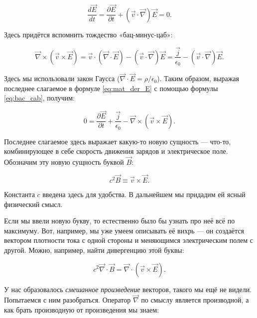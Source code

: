 \documentclass[a4paper,12pt]{article}
\newcommand{\pt}{\partial}
\newcommand{\eps}{\epsilon}
\newcommand{\vn}{\vec{\nabla}}
\begin{document}
\begin{equation}
  \label{eq:mat_der_E}
  \frac{d\vec{E}}{dt} = \frac{\pt \vec{E}}{\pt t} + (\vec{v}\cdot \vn)
  \vec{E} = 0.
\end{equation}

Здесь придётся вспомнить тождество «бац-минус-цаб»: 

\begin{equation}
  \label{eq:bac_cab}
  \vn \times \left( \vec{v} \times \vec{E} \right) = \vec{v} \cdot (\vn
  \cdot \vec{E}) - (\vec{v}\cdot \vn) \vec{E} = \frac{\vec{j}}{\eps_0}  -
  (\vec{v}\cdot \vn) \vec{E}.
\end{equation}

Здесь мы использовали закон Гаусса ($\vn \cdot \vec{E} = \rho/\eps_0$). Таким образом, выражая последнее слагаемое в формуле
\eqref{eq:mat_der_E} с помощью формулы \eqref{eq:bac_cab}, получим: 

\begin{equation}
  \label{eq:maxwell_eq_4_1}
  0 = \frac{\pt \vec{E}}{\pt t} + \frac{\vec{j}}{\eps_0} - \vn \times \left(
    \vec{v} \times \vec{E} \right).
\end{equation}

Последнее слагаемое здесь выражает какую-то новую сущность — что-то,
комбинирующее в себе скорость движения зарядов и электрическое
поле. Обозначим эту новую сущность буквой $\vec{B}$: 

\begin{equation}
  \label{eq:def_magnetic}
  c^2\vec{B} \equiv \vec{v} \times \vec{E}. 
\end{equation}

Константа $c$ введена здесь для удобства. В дальнейшем мы придадим ей
ясный физический смысл.

Если мы ввели новую букву, то естественно было бы узнать про неё всё
по максимуму. Вот, например, мы уже умеем описывать её вихрь — он
создаётся вектором плотности тока с одной стороны и меняющимся
электрическим полем с другой. Можно, например, найти дивергенцию этой
буквы:

\begin{equation}
  \label{eq:div_B_1}
  c^2\vn \cdot \vec{B} =  \vn \cdot \left( \vec{v} \times \vec{E} \right).
\end{equation}

У нас образовалось \textit{смешанное произведение} векторов, такого мы
ещё не видели. Попытаемся с ним разобраться. Оператор $\vn$ по смыслу
является производной, а как брать производную от произведения мы
знаем: 
\end{document}
